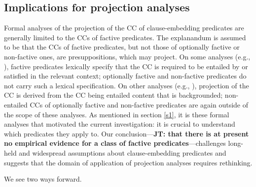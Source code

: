 \documentclass[11pt,fleqn]{article}
\newcommand{\6}{\mbox{$[\hspace*{-.6mm}[$}}
\newcommand{\9}{\mbox{$]\hspace*{-.6mm}]$}}
\newcommand{\jt}[1]{\textbf{\color{blue}JT: #1}}
\begin{document}
\subsection{Implications for projection analyses}\label{s42}

Formal analyses of the projection of the CC of clause-embedding predicates are generally limited to the CCs of factive predicates. The explanandum is assumed to be that the CCs of factive predicates, but not those of optionally factive or non-factive ones, are presuppositions, which may project. On some analyses (e.g., \citealt{heim83,vds92}), factive predicates lexically specify that the CC is required to be entailed by or satisfied in the relevant context; optionally factive and non-factive predicates do not carry such a lexical specification. On other analyses (e.g., \citealt{abrusan2011,abrusan2016,romoli2015,best-question}), projection of the CC is derived from the CC being entailed content that is backgrounded; non-entailed CCs of optionally factive and non-factive predicates are again outside of the scope of these analyses. As mentioned in section \ref{s1}, it is these formal analyses that motivated the current investigation: it is crucial to understand which predicates they apply to. Our conclusion---\jt{that there is at present no empirical evidence for a class of factive predicates}---challenges long-held and widespread assumptions about clause-embedding predicates and suggests that the domain of application of projection analyses requires rethinking.

We see two ways forward. 
\end{document}
